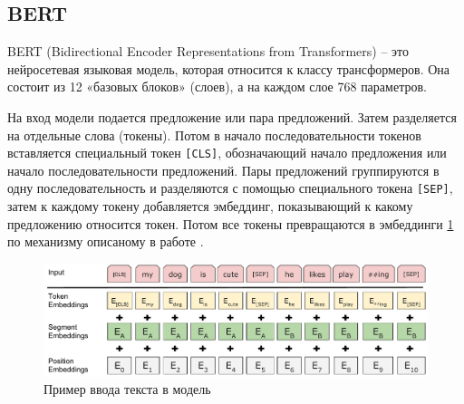 \documentclass[PI, VKR]{HSEUniversity}
\begin{document}
\subsection{BERT}
\label{sec:org05d2de9}
BERT \autocite{devlin2018bert} (Bidirectional Encoder Representations from Transformers) -- это нейросетевая языковая модель, которая относится к классу трансформеров. Она состоит из 12 «базовых блоков» (слоев), а на каждом слое 768 параметров.

На вход модели подается предложение или пара предложений. Затем разделяется на отдельные слова (токены). Потом в начало последовательности токенов вставляется специальный токен \texttt{[CLS]}, обозначающий начало предложения или начало последовательности предложений. Пары предложений группируются в одну последовательность и разделяются с помощью специального токена \texttt{[SEP]}, затем к каждому токену добавляется эмбеддинг, показывающий к какому предложению относится токен. Потом все токены превращаются в эмбеддинги \ref{fig:inputemebeddings} по механизму описаному в работе \autocite{NIPS2017_3f5ee243}.

\begin{figure}[h]
\centering
\includegraphics[width=.9\linewidth]{img/Input_Emebeddings.pdf}
\caption{\label{fig:inputemebeddings}Пример ввода текста в модель}
\end{figure}
\end{document}
